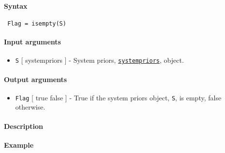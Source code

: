 


	\paragraph{Syntax}
 
 \begin{verbatim}
 Flag = isempty(S)
 \end{verbatim}
 
 \paragraph{Input arguments}
 
 \begin{itemize}
 \item
   \texttt{S} {[} systempriors {]} - System priors,
   \href{systempriors/Contents}{\texttt{systempriors}}, object.
 \end{itemize}
 
 \paragraph{Output arguments}
 
 \begin{itemize}
 \item
   \texttt{Flag} {[} true \textbar{} false {]} - True if the system
   priors object, \texttt{S}, is empty, false otherwise.
 \end{itemize}
 
 \paragraph{Description}
 
 \paragraph{Example}


